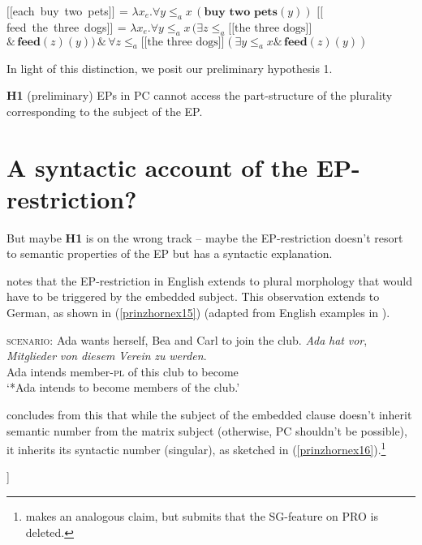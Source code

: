 \documentclass[output=paper,colorlinks,citecolor=brown,
]{langscibook}
\newcommand{\sem}[2]{\mbox{$[\![${#2}$]\!]^{#1}$}} %
\begin{document}
\ea	 
\ea \sem{}{each buy two pets} = $\lambda x_{e}. \forall y \le_{a} x \,(\textbf{buy two pets}(y))$\label{prinzhornex13a}
\ex	 \sem{}{feed the three dogs} = $\lambda x_{e}. \forall y \le_{a} x \,(\exists z \le_{a} \sem{}{the three dogs}$\\$ \&\,\textbf{feed}(z)(y)) \,\&\, \forall z \le_{a} \sem{}{the three dogs} (\exists y \le_{a} x \&\, \textbf{feed}(z)(y))$\label{prinzhornmy13}
\z\z

In light of this distinction, we posit our preliminary hypothesis 1.


\ea \textbf{H1} (preliminary) \quad EPs in PC cannot access the part-structure of the plurality corresponding to the subject of the EP.\label{prinzhornex14}
\z 




\section{A syntactic account of the EP-restriction?}\label{prinzhornsec:3}

But maybe \textbf{H1} is on the wrong track -- maybe the EP-restriction doesn't resort to semantic properties of the EP but has a syntactic explanation. 

\cite{Landau:2000} notes that the EP-restriction in English extends to plural morphology that would have to be triggered by  the embedded subject. This observation extends to German, as shown in (\ref{prinzhornex15}) (adapted from English examples in \citealt{Landau:2000}).


\ea \label{prinzhornex15}
\ea \textsc{scenario:} Ada wants herself, Bea and Carl to join the club.
\ex \gll *\textit{Ada} \textit{hat} \textit{vor}, \textit{Mitglieder} \textit{von} \textit{diesem} \textit{Verein} \textit{zu} \textit{werden}.\\
   Ada intends {}  member-\textsc{pl} of this club to become \\
   \glt `*Ada intends to become members of the club.' 
   \z\z



\cite{Landau:2000} concludes from this that while the subject of the embedded clause doesn't inherit semantic number from the matrix subject (otherwise, PC shouldn't be possible), it inherits its syntactic number (singular), as sketched in (\ref{prinzhornex16}).\footnote{\cite{Pearson:2016} makes an analogous claim, but submits that the \textsc{SG}-feature on PRO is deleted. 
}

\ea [Ada$_{sg}$ plant [PRO$_{sg}$ Mitglieder von diesem Verein zu werden]]\label{prinzhornex16}
\z
\end{document}
